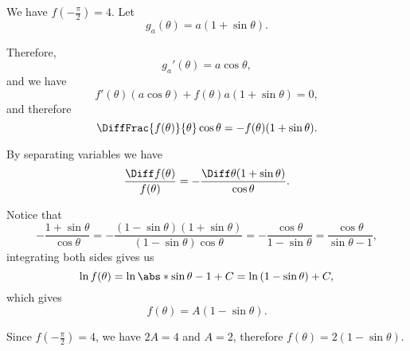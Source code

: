 We have \(f\left(-\frac{\pi}{2}\right) = 4\). Let
\[
    g_a(\theta) = a(1 + \sin \theta).
\]

Therefore,
\[
    g_a'(\theta) = a \cos \theta,
\]
and we have
\[
    f'(\theta) (a \cos \theta) + f(\theta) a (1 + \sin \theta) = 0,
\]
and therefore
\[
    \DiffFrac{f(\theta)}{\theta} \cos \theta = - f(\theta) (1 + \sin \theta).
\]

By separating variables we have
\[
    \frac{\Diff f(\theta)}{f(\theta)} = - \frac{\Diff \theta (1 + \sin \theta)}{\cos \theta}.
\]

Notice that
\[
    -\frac{1 + \sin \theta}{\cos \theta} = - \frac{(1 - \sin \theta) (1 + \sin \theta)}{(1 - \sin \theta) \cos \theta} = - \frac{\cos \theta}{1 - \sin \theta} = \frac{\cos \theta}{\sin \theta - 1},
\]
integrating both sides gives us
\[
    \ln f(\theta) = \ln \abs*{\sin \theta - 1} + C = \ln \left(1 - \sin \theta\right) + C,
\]
which gives
\[
    f(\theta) = A (1 - \sin \theta).
\]

Since \(f\left(-\frac{\pi}{2}\right) = 4\), we have \(2A = 4\) and \(A = 2\), therefore \(f(\theta) = 2 (1 - \sin \theta)\).

\begin{center}
    
\end{center}